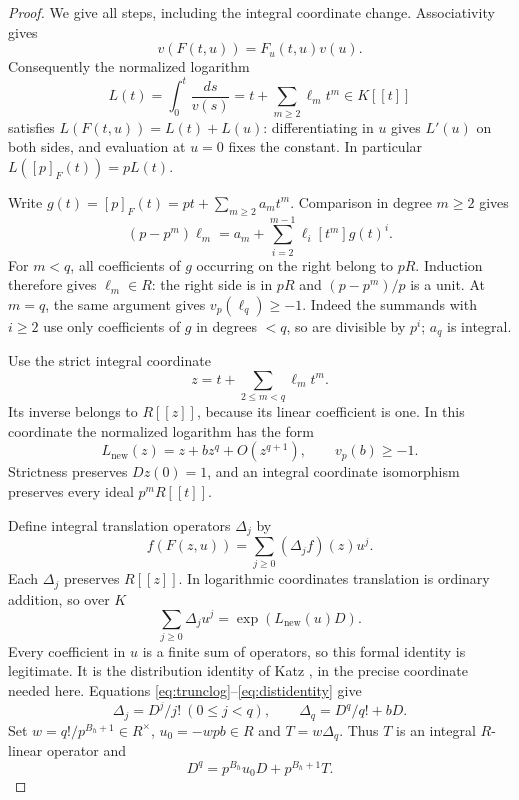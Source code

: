 \documentclass[11pt,a4paper]{article}
\theoremstyle{definition}\newtheorem{remark}[theorem]{Remark}
\newcommand{\vp}{v_p}\newcommand{\dR}{\mathrm{dR}}\newcommand{\crys}{\mathrm{crys}}
\begin{document}
\begin{proof}
We give all steps, including the integral coordinate change. Associativity gives
\[
 v(F(t,u))=F_u(t,u)v(u).
\]
Consequently the normalized logarithm
\[
 L(t)=\int_0^t\frac{ds}{v(s)}=t+\sum_{m\ge2}\ell_m t^m\in K[[t]]
\]
satisfies $L(F(t,u))=L(t)+L(u)$: differentiating in $u$ gives $L'(u)$ on both sides, and evaluation at $u=0$ fixes the constant. In particular $L([p]_F(t))=pL(t)$.

Write $g(t)=[p]_F(t)=pt+\sum_{m\ge2}a_m t^m$. Comparison in degree $m\ge2$ gives
\begin{equation}\label{eq:logrec}
 (p-p^m)\ell_m=a_m+\sum_{i=2}^{m-1}\ell_i[t^m]g(t)^i.
\end{equation}
For $m<q$, all coefficients of $g$ occurring on the right belong to $pR$. Induction therefore gives $\ell_m\in R$: the right side is in $pR$ and $(p-p^m)/p$ is a unit. At $m=q$, the same argument gives $\vp(\ell_q)\ge-1$. Indeed the summands with $i\ge2$ use only coefficients of $g$ in degrees $<q$, so are divisible by $p^i$; $a_q$ is integral.

Use the strict integral coordinate
\[
 z=t+\sum_{2\le m<q}\ell_m t^m.
\]
Its inverse belongs to $R[[z]]$, because its linear coefficient is one. In this coordinate the normalized logarithm has the form
\begin{equation}\label{eq:trunclog}
 L_{\mathrm{new}}(z)=z+bz^q+O(z^{q+1}),\qquad \vp(b)\ge-1.
\end{equation}
Strictness preserves $Dz(0)=1$, and an integral coordinate isomorphism preserves every ideal $p^mR[[t]]$.

Define integral translation operators $\Delta_j$ by
\begin{equation}\label{eq:translation}
 f(F(z,u))=\sum_{j\ge0}(\Delta_j f)(z)u^j.
\end{equation}
Each $\Delta_j$ preserves $R[[z]]$. In logarithmic coordinates translation is ordinary addition, so over $K$
\begin{equation}\label{eq:distidentity}
 \sum_{j\ge0}\Delta_j u^j=\exp(L_{\mathrm{new}}(u)D).
\end{equation}
Every coefficient in $u$ is a finite sum of operators, so this formal identity is legitimate. It is the distribution identity of Katz \cite[Corollary 1.8, p.~669]{Katz81}, in the precise coordinate needed here. Equations \eqref{eq:trunclog}--\eqref{eq:distidentity} give
\[
 \Delta_j=D^j/j!\ (0\le j<q),\qquad
 \Delta_q=D^q/q!+bD.
\]
Set $w=q!/p^{B_h+1}\in R^\times$, $u_0=-wpb\in R$ and $T=w\Delta_q$. Thus $T$ is an integral $R$-linear operator and
\begin{equation}\label{eq:keyop}
 D^q=p^{B_h}u_0D+p^{B_h+1}T.
\end{equation}


\end{proof}
\end{document}
